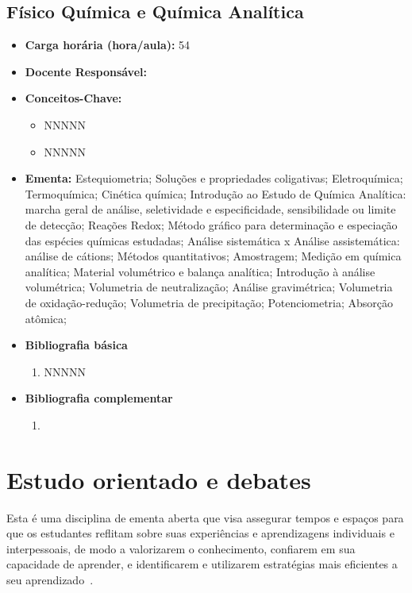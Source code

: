 \documentclass[11pt,fleqn]{book} %
\begin{document}
\subsection{Físico Química e Química Analítica}\label{disc:analitica}
\begin{itemize}
	\item \textbf{Carga horária (hora/aula):} 54
	\item \textbf{Docente Responsável:}
	\item \textbf{Conceitos-Chave:}
	\begin{itemize}
		\item NNNNN
		\item NNNNN
	\end{itemize}
	\item \textbf{Ementa:} 
	Estequiometria;
	Soluções e propriedades coligativas;
	Eletroquímica;
	Termoquímica;
	Cinética química;
	Introdução ao Estudo de Química Analítica: marcha geral de análise, seletividade e especificidade, sensibilidade ou limite de detecção;
	Reações Redox; 
	Método gráfico para determinação e especiação das espécies químicas estudadas;
	Análise sistemática x Análise assistemática: análise de cátions; 
	Métodos quantitativos;
	Amostragem; 
	Medição em química analítica; 
	Material volumétrico e balança analítica; 
	Introdução à análise volumétrica;
	Volumetria de neutralização;
	Análise gravimétrica; 
	Volumetria de oxidação-redução; 
	Volumetria de precipitação; 
	Potenciometria; 
	Absorção atômica;
	\item \textbf{Bibliografia básica}
	\begin{enumerate}
		\item NNNNN
	\end{enumerate}
	\item \textbf{Bibliografia complementar}
	\begin{enumerate}
		\item 
	\end{enumerate}	
\end{itemize}

\newpage
\section{Estudo orientado e debates}\label{ementasEstudo}
\indent

Esta é uma disciplina de ementa aberta que visa assegurar tempos e espaços para que os estudantes reflitam sobre suas experiências e aprendizagens individuais e interpessoais, de modo a valorizarem o conhecimento, confiarem em sua capacidade de aprender, e identificarem e utilizarem estratégias mais eficientes a seu aprendizado~\cite{BNCC2019}.
\end{document}
